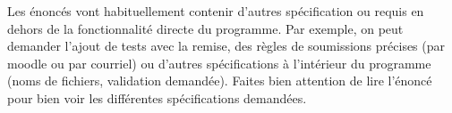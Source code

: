Les énoncés vont habituellement contenir d'autres spécification ou requis en dehors de la fonctionnalité directe du programme. Par exemple, on peut demander l'ajout de tests avec la remise, des règles de soumissions précises (par moodle ou par courriel) ou d'autres spécifications à l'intérieur du programme (noms de fichiers, validation demandée). Faites bien attention de lire l'énoncé pour bien voir les différentes spécifications demandées.